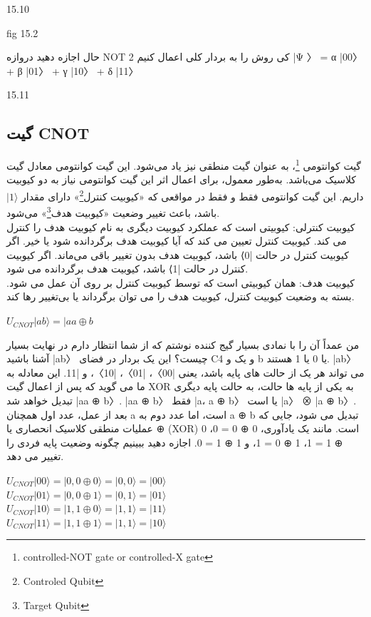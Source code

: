 \documentclass{book}
\begin{document}
15.10

fig 15.2

حال اجازه دهید دروازه NOT 2 کی روش را به بردار کلی اعمال کنیم |Ψ 〉 = α |00〉 +
β |01〉 + γ |10〉 + δ |11〉

15.11

\subsection*{گیت CNOT}

گیت کوانتومی \footnote{ controlled-NOT gate or controlled-X gate}، به عنوان گیت منطقی نیز یاد می‌شود. این گیت کوانتومی معادل گیت  کلاسیک می‌باشد.
به‌طور معمول، برای اعمال اثر این گیت کوانتومی نیاز به دو کیوبیت داریم. این گیت کوانتومی فقط و فقط در مواقعی که «کیوبیت کنترل\footnote{Controled Qubit}» دارای مقدار $\vert 1 \rangle$ باشد، باعث تغییر وضعیت «کیوبیت هدف\footnote{Target Qubit}» می‌شود.\\

کیوبیت کنترلی: کیوبیتی است که عملکرد کیوبیت دیگری به نام کیوبیت هدف را کنترل می کند. کیوبیت کنترل تعیین می کند که آیا کیوبیت هدف برگردانده شود یا خیر. اگر کیوبیت کنترل در حالت |0⟩ باشد، کیوبیت هدف بدون تغییر باقی می‌ماند. اگر کیوبیت کنترل در حالت |1⟩ باشد، کیوبیت هدف برگردانده می شود.\\

کیوبیت هدف: همان کیوبیتی است که توسط کیوبیت کنترل بر روی آن عمل می شود. بسته به وضعیت کیوبیت کنترل، کیوبیت هدف را می توان برگرداند یا بی‌تغییر رها کند.\\


\begin{center}
	$U_{CNOT}\vert ab\rangle = \vert a a\oplus b$
\end{center}

من عمداً آن را با نمادی بسیار گیج کننده نوشتم که از شما انتظار دارم
در نهایت بسیار آشنا باشید |ab〉 چیست؟ این یک بردار در فضای C4 و یک و
b یا 0 یا 1 هستند. |ab〉 می تواند هر یک از حالت های پایه باشد، یعنی |00〉، |01〉، |10〉، و
|11. این معادله به ما می گوید که پس از اعمال گیت XOR به یکی از پایه ها
حالت، به حالت پایه دیگری تبدیل خواهد شد |aa ⊕ b〉. |aa ⊕ b〉 فقط |a، a ⊕ b〉 یا است
|a〉 ⊗ |a ⊕ b〉. بعد از عمل، عدد اول همچنان a است، اما عدد دوم
به a ⊕ b تبدیل می شود، جایی که ⊕ عملیات منطقی کلاسیک انحصاری یا (XOR) است. مانند
یک یادآوری، 0 ⊕ 0 = 0، 0 ⊕ 1 = 1، 1 ⊕ 0 = 1، و 1 ⊕ 1 = 0. اجازه دهید ببینیم چگونه
وضعیت پایه فردی را تغییر می دهد.

\begin{center}
	$U_{CNOT}|00\rangle=|0,0 \oplus 0\rangle=|0,0\rangle=|00\rangle$ \\
	$U_{CNOT}|01\rangle=|0,0 \oplus 1\rangle=|0,1\rangle=|01\rangle$ \\
	$U_{CNOT}|10\rangle=|1,1 \oplus 0\rangle=|1,1\rangle=|11\rangle$\\
	$U_{CNOT}|11\rangle=|1,1 \oplus 1\rangle=|1,1\rangle=|10\rangle$
\end{center}
\end{document}
